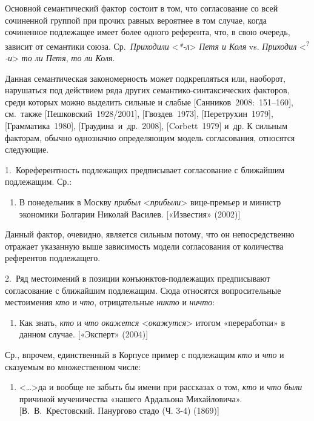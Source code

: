 Основной семантический фактор состоит в том, что согласование со всей
сочиненной группой при прочих равных вероятнее в том случае, когда
сочиненное подлежащее имеет более одного референта, что, в свою очередь,
зависит от семантики союза. Ср.~\emph{Приходили}
\textless{}\emph{*-л}\textgreater{} \emph{Петя и Коля} vs.
\emph{Приходил} \textless{}\textsuperscript{?}\emph{-и}\textgreater{}
\emph{то ли Петя}, \emph{то ли Коля}.

Данная семантическая закономерность может подкрепляться или, наоборот,
нарушаться под действием ряда других семантико-синтаксических факторов,
среди которых можно выделить сильные и слабые
{[}Санников~2008:~151--160{]}, см.~также {[}Пешковский~1928/2001{]},
{[}Гвоздев~1973{]}, {[}Перетрухин~1979{]}, {[}Грамматика~1980{]},
{[}Граудина~и~др.~2008{]}, {[}Corbett~1979{]} и~др. К сильным факторам,
обычно однозначно определяющим модель согласования, относятся следующие.

1.~Кореферентность подлежащих предписывает согласование с ближайшим
подлежащим. Ср.:

\begin{enumerate}
\def\labelenumi{(\arabic{enumi})}
\setcounter{enumi}{85}
\item
  В понедельник в Москву \emph{прибыл}
  \textless*\emph{прибыли}\textgreater{} вице-премьер и министр
  экономики Болгарии Николай Василев. {[}«Известия» (2002){]}
\end{enumerate}

Данный фактор, очевидно, является сильным потому, что он непосредственно
отражает указанную выше зависимость модели согласования от количества
референтов подлежащего.

2.~Ряд местоимений в позиции конъюнктов-подлежащих предписывают
согласование с ближайшим подлежащим. Сюда относятся вопросительные
местоимения \emph{кто} и \emph{что}, отрицательные \emph{никто} и
\emph{ничто}:

\begin{enumerate}
\def\labelenumi{(\arabic{enumi})}
\setcounter{enumi}{86}
\item
  Как знать, \emph{кто} и \emph{что} \emph{окажется}
  \textless*\emph{окажутся}\textgreater{} итогом «переработки» в данном
  случае. {[}«Эксперт» (2004){]}
\end{enumerate}

Ср., впрочем, единственный в Корпусе пример с подлежащим \emph{кто} и
\emph{что} и сказуемым во множественном числе:

\begin{enumerate}
\def\labelenumi{(\arabic{enumi})}
\setcounter{enumi}{87}
\item
  \textless\ldots\textgreater да и вообще не забыть бы имени при
  рассказах о том, \emph{кто} и \emph{что} \emph{были} причиной
  мученичества «нашего Ардальона Михайловича». {[}В.~В.~Крестовский.
  Панургово стадо (Ч. 3-4) (1869){]}
\end{enumerate}


